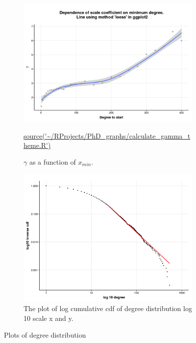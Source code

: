 \begin{figure}
    \centering
    \begin{subfigure}[t]{0.45\textwidth}
        \centering
        \includegraphics[width=\linewidth]{images/chapter3/poweRlaw/Rplot_gamma_theme.png} 
     \caption[$\gamma$ as function of $x_{min}$]{$\gamma$ as a function of $x_{min}$. }
    \tiny\url{source('~/RProjects/PhD_graphs/calculate_gamma_theme.R')}
        \label{fig:gamma}
    \end{subfigure}
    \hfill
    \begin{subfigure}[t]{0.45\textwidth}
        \centering
        \includegraphics[width=\linewidth]{images/chapter3/ggplot2/theme/powerlaw/Rplot01_chapter3_cdf_and_powerlaw.png} 
        \caption{The plot of log cumulative cdf of degree distribution log 10 scale x and y.} \label{fig:log_degree_distribution}
    \end{subfigure}
    \caption{Plots of degree distribution}
    \label{fig:Plots of degree distribution}
\end{figure}



